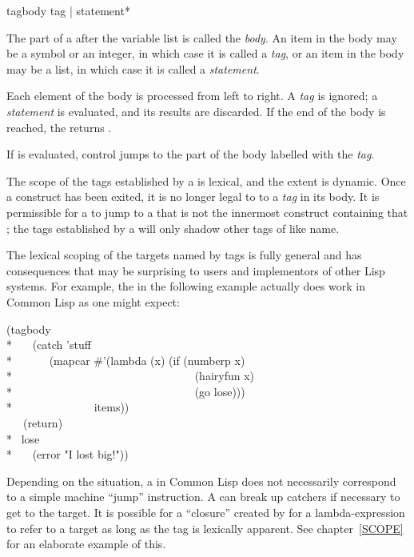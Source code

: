 \begin{defspec}
tagbody {tag | statement}*

The part of a  after the variable list is called the \emph{body}.
An item in the body may be a symbol or an integer, in which case it is called a
\emph{tag}, or an item in the body may be a list, in which case it is called a 
\emph{statement}.

Each element of the body is processed from left to right.
A \emph{tag} is ignored; a \emph{statement}
is evaluated, and its results are discarded.  If the end of the body
is reached, the  returns {\false}.

If  is evaluated, control jumps to the part of the body
labelled with the \emph{tag}.

The scope of the tags established by a  is lexical,
and the extent is dynamic.  Once a  construct has
been exited, it is no longer legal to  to a \emph{tag} in its body.
It is permissible for a  to jump to a  that is not
the innermost  construct containing that ;
the tags established by a  will only shadow other tags
of like name.

The lexical scoping of the  targets named by tags is
fully general and has consequences that may be surprising
to users and implementors of other Lisp systems.
For example, the  in the following example actually does
work in Common Lisp as one might expect:
\begin{lisp}
(tagbody \\*
~~~(catch 'stuff \\*
~~~~~~(mapcar \#'(lambda (x) (if (numberp x) \\*
~~~~~~~~~~~~~~~~~~~~~~~~~~~~~~~~(hairyfun x) \\*
~~~~~~~~~~~~~~~~~~~~~~~~~~~~~~~~(go lose))) \\*
~~~~~~~~~~~~~~items)) \\
~~~(return) \\*
~lose \\*
~~~(error "I lost big!"))
\end{lisp}
Depending on the situation, a  in Common Lisp does not necessarily
correspond to a simple machine ``jump'' instruction.
A  can break up catchers if necessary to get
to the target.  It is possible for a ``closure'' created by  for
a lambda-expression to refer to a  target as long as the tag
is lexically apparent.  See chapter~\ref{SCOPE} for an elaborate
example of this.


\end{defspec}
